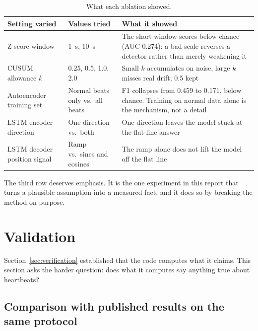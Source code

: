 \documentclass[a4paper, 12pt]{article}
\begin{document}
\begin{table}[htbp]
  \centering
  \small
  \caption{What each ablation showed.}
  \label{tab:ablations}
  \begin{tabular}{@{}p{}p{}p{}@{}}
    \toprule
    \textbf{Setting varied} & \textbf{Values tried} & \textbf{What it showed} \\
    \midrule
    Z-score window
      & \SI{1}{\second}, \SI{10}{\second}
      & The short window scores below chance (AUC \num{0.274}): a bad scale
        reverses a detector rather than merely weakening it \\
    \addlinespace
    CUSUM allowance $k$
      & 0.25, 0.5, 1.0, 2.0
      & Small $k$ accumulates on noise, large $k$ misses real drift; 0.5 kept \\
    \addlinespace
    Autoencoder training set
      & Normal beats only vs.\ all beats
      & F1 collapses from \num{0.459} to \num{0.171}, below chance. Training on
        normal data alone is the mechanism, not a detail \\
    \addlinespace
    LSTM encoder direction
      & One direction vs.\ both
      & One direction leaves the model stuck at the flat-line answer \\
    \addlinespace
    LSTM decoder position signal
      & Ramp vs.\ sines and cosines
      & The ramp alone does not lift the model off the flat line \\
    \bottomrule
  \end{tabular}
\end{table}

The third row deserves emphasis. It is the one experiment in this report that turns
a plausible assumption into a measured fact, and it does so by breaking the method
on purpose.


\section{Validation} \label{sec:validation}

Section~\ref{sec:verification} established that the code computes what it claims.
This section asks the harder question: does what it computes say anything true
about heartbeats?

\subsection{Comparison with published results on the same protocol}
\label{subsec:published}
\end{document}
